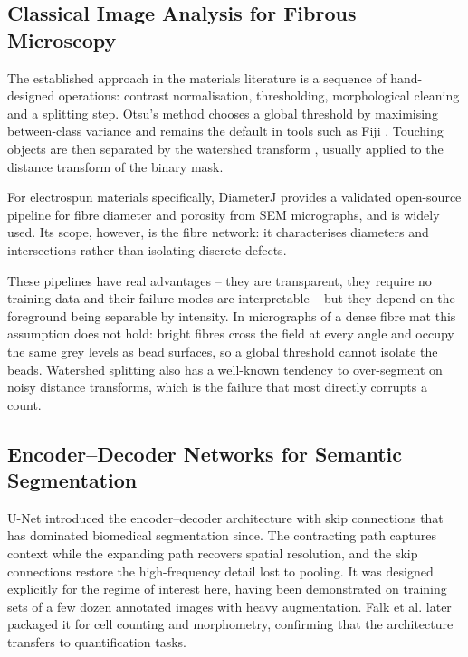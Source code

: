 \subsection{Classical Image Analysis for Fibrous Microscopy}

The established approach in the materials literature is a sequence of hand-designed
operations: contrast normalisation, thresholding, morphological cleaning and a
splitting step. Otsu's method \cite{otsu1979threshold} chooses a global threshold by
maximising between-class variance and remains the default in tools such as Fiji
\cite{schindelin2012fiji}. Touching objects are then separated by the watershed
transform \cite{vincent1991watersheds}, usually applied to the distance transform of
the binary mask.

For electrospun materials specifically, DiameterJ \cite{hotaling2015diameterj}
provides a validated open-source pipeline for fibre diameter and porosity from SEM
micrographs, and is widely used. Its scope, however, is the fibre network: it
characterises diameters and intersections rather than isolating discrete defects.

These pipelines have real advantages -- they are transparent, they require no
training data and their failure modes are interpretable -- but they depend on the
foreground being separable by intensity. In micrographs of a dense fibre mat this
assumption does not hold: bright fibres cross the field at every angle and occupy
the same grey levels as bead surfaces, so a global threshold cannot isolate the
beads. Watershed splitting also has a well-known tendency to over-segment on noisy
distance transforms, which is the failure that most directly corrupts a count.

\subsection{Encoder--Decoder Networks for Semantic Segmentation}

U-Net \cite{ronneberger2015unet} introduced the encoder--decoder architecture with
skip connections that has dominated biomedical segmentation since. The contracting
path captures context while the expanding path recovers spatial resolution, and the
skip connections restore the high-frequency detail lost to pooling. It was designed
explicitly for the regime of interest here, having been demonstrated on training
sets of a few dozen annotated images with heavy augmentation. Falk et al.
\cite{falk2019unet} later packaged it for cell counting and morphometry, confirming
that the architecture transfers to quantification tasks.

